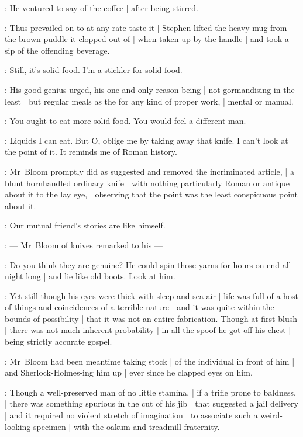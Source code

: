 :
He ventured to say of the coffee |
after being stirred.

:
Thus prevailed on to at any rate taste it |
Stephen lifted the heavy mug from the brown puddle it clopped out of |
when taken up by the handle |
and took a sip of the offending beverage.

\Bloom:
Still, it's solid food.
I'm a stickler for solid food.

:
His good genius urged,
his one and only reason being |
not gormandising in the least |
but regular meals as the  for any kind of proper work, |
mental or manual.

\Bloom:
You ought to eat more solid food.
You would feel a different man.

\Stephen:
Liquids I can eat.
But O, oblige me by taking away that knife.
I can't look at the point of it.
It reminds me of Roman history.

:
Mr~Bloom promptly did as suggested and removed the incriminated article, |
a blunt hornhandled ordinary knife |
with nothing particularly Roman or antique about it to the lay eye, |
observing that the point was the least conspicuous point about it.

\Bloom:
Our mutual friend's stories are like himself.

:
    --- Mr~Bloom  of knives
        remarked to his   ---

\Bloom:
Do you think they are genuine?
He could spin those yarns for hours on end all night long |
and lie like old boots.
Look at him.

:
Yet still though his eyes were thick with sleep and sea air |
life was full of a host of things and coincidences of a terrible nature |
and it was quite within the bounds of possibility |
that it was not an entire fabrication.
Though at first blush |
there was not much inherent probability |
in all the spoof he got off his chest |
being strictly accurate gospel.

:
Mr~Bloom had been meantime taking stock |
of the individual in front of him |
and Sherlock-Holmes-ing him up |
ever since he clapped eyes on him.

:
Though a well-preserved man of no little stamina, |
if a trifle prone to baldness, |
there was something spurious in the cut of his jib |
that suggested a jail delivery |
and it required no violent stretch of imagination |
to associate such a weird-looking specimen |
with the oakum and treadmill fraternity.

